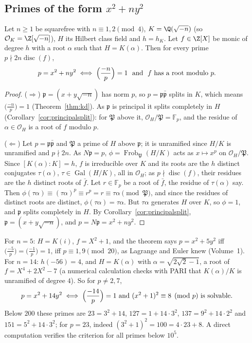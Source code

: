 \subsection*{Primes of the form \texorpdfstring{$x^2+ny^2$}{x²+ny²}}

\begin{theorem}\label{thm:xnyy}
Let $n\ge1$ be squarefree with $n\equiv1,2\pmod4$, $K=\Q(\sqrt{-n})$ (so $\mathcal O_K=\Z[\sqrt{-n}]$), $H$ its Hilbert class field and $h=h_K$. Let
$f\in\Z[X]$ be monic of degree $h$ with a root $\alpha$ such that $H=K(\alpha)$. Then for every prime $p\nmid2n\operatorname{disc}(f)$,
\[
p=x^2+ny^2\iff\Bigl(\frac{-n}p\Bigr)=1\ \text{ and }\ f\text{ has a root modulo }p.
\]
\end{theorem}
\begin{proof}
($\Rightarrow$) $\mathfrak p=(x+y\sqrt{-n})$ has norm $p$, so $p=\mathfrak p\bar{\mathfrak p}$ splits in $K$, which means $\bigl(\frac{-n}p\bigr)=1$
(Theorem~\ref{thm:kd}). As $\mathfrak p$ is principal it splits completely in $H$ (Corollary~\ref{cor:principalsplit}): for $\mathfrak P$ above it,
$\mathcal O_H/\mathfrak P=\mathbb F_p$, and the residue of $\alpha\in\mathcal O_H$ is a root of $f$ modulo $p$.

($\Leftarrow$) Let $p=\mathfrak p\bar{\mathfrak p}$ and $\mathfrak P$ a prime of $H$ above $\mathfrak p$; it is unramified since $H/K$ is unramified and $p\nmid2n$. As
$N\mathfrak p=p$, $\phi=\operatorname{Frob}_{\mathfrak P}(H/K)$ acts as $x\mapsto x^p$ on $\mathcal O_H/\mathfrak P$. Since $[K(\alpha):K]=h$, $f$ is irreducible over $K$ and
its roots are the $h$ distinct conjugates $\tau(\alpha)$, $\tau\in\operatorname{Gal}(H/K)$, all in $\mathcal O_H$; as $p\nmid\operatorname{disc}(f)$, their residues are
the $h$ distinct roots of $\bar f$. Let $r\in\mathbb F_p$ be a root of $\bar f$, the residue of $\tau(\alpha)$ say. Then $\phi(\tau\alpha)\equiv(\tau\alpha)^p
\equiv r^p=r\equiv\tau\alpha\pmod{\mathfrak P}$, and since the residues of distinct roots are distinct, $\phi(\tau\alpha)=\tau\alpha$. But $\tau\alpha$
generates $H$ over $K$, so $\phi=1$, and $\mathfrak p$ splits completely in $H$. By Corollary~\ref{cor:principalsplit}, $\mathfrak p=(x+y\sqrt{-n})$, and
$p=N\mathfrak p=x^2+ny^2$.
\end{proof}

\begin{example}\label{exa:n14}
For $n=5$: $H=K(i)$, $f=X^2+1$, and the theorem says $p=x^2+5y^2$ iff $\bigl(\frac{-5}p\bigr)=\bigl(\frac{-1}p\bigr)=1$, iff $p\equiv1,9\pmod{20}$, as
Lagrange and Euler knew (Volume~1). For $n=14$: $h(-56)=4$, and $H=K(\alpha)$ with $\alpha=\sqrt{2\sqrt2-1}$, a root of $f=X^4+2X^2-7$ (a numerical calculation
checks with PARI that $K(\alpha)/K$ is unramified of degree $4$). So for $p\ne2,7$,
\[
p=x^2+14y^2\iff\Bigl(\frac{-14}p\Bigr)=1\text{ and }(x^2+1)^2\equiv8\pmod p\text{ is solvable}.
\]
Below $200$ these primes are $23=3^2+14$, $127=1+14\cdot3^2$, $137=9^2+14\cdot2^2$ and $151=5^2+14\cdot3^2$; for $p=23$, indeed
$(3^2+1)^2=100=4\cdot23+8$. A direct computation verifies the criterion for all primes below $10^5$.
\end{example}

